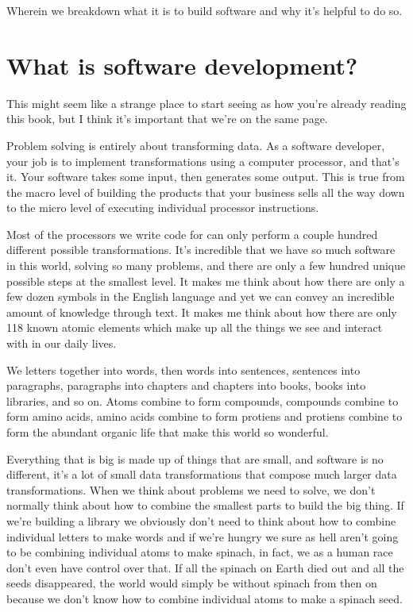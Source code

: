 \documentclass[
]{book}
\begin{document}
Wherein we breakdown what it is to build software and why it's helpful to do so.

\hypertarget{what-is-software-development}{%
\chapter{What is software development?}\label{what-is-software-development}}

This might seem like a strange place to start seeing as how you're already reading this book, but I think it's important that we're on the same page.

Problem solving is entirely about transforming data. As a software developer, your job is to implement transformations using a computer processor, and that's it. Your software takes some input, then generates some output. This is true from the macro level of building the products that your business sells all the way down to the micro level of executing individual processor instructions.

Most of the processors we write code for can only perform a couple hundred different possible transformations. It's incredible that we have so much software in this world, solving so many problems, and there are only a few hundred unique possible steps at the smallest level. It makes me think about how there are only a few dozen symbols in the English language and yet we can convey an incredible amount of knowledge through text. It makes me think about how there are only 118 known atomic elements which make up all the things we see and interact with in our daily lives.

We letters together into words, then words into sentences, sentences into paragraphs, paragraphs into chapters and chapters into books, books into libraries, and so on. Atoms combine to form compounds, compounds combine to form amino acids, amino acids combine to form protiens and protiens combine to form the abundant organic life that make this world so wonderful.

Everything that is big is made up of things that are small, and software is no different, it's a lot of small data transformations that compose much larger data transformations. When we think about problems we need to solve, we don't normally think about how to combine the smallest parts to build the big thing. If we're building a library we obviously don't need to think about how to combine individual letters to make words and if we're hungry we sure as hell aren't going to be combining individual atoms to make spinach, in fact, we as a human race don't even have control over that. If all the spinach on Earth died out and all the seeds disappeared, the world would simply be without spinach from then on because we don't know how to combine individual atoms to make a spinach seed.
\end{document}
